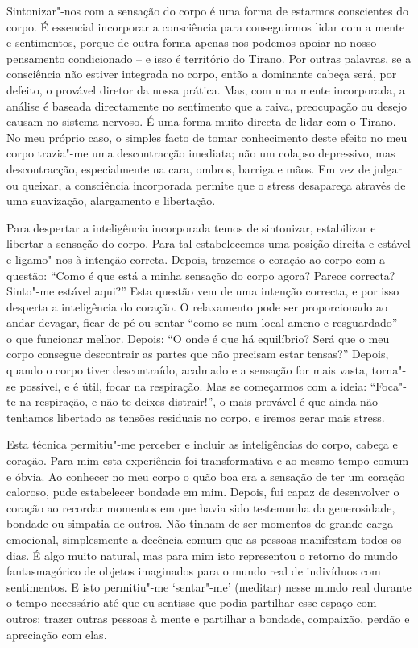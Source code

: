 Sintonizar"-nos com a sensação do corpo é uma forma de estarmos
conscientes do corpo. É essencial incorporar a consciência para
conseguirmos lidar com a mente e sentimentos, porque de outra forma
apenas nos podemos apoiar no nosso pensamento condicionado -- e isso é
território do Tirano. Por outras palavras, se a consciência não estiver
integrada no corpo, então a dominante cabeça será, por defeito, o
provável diretor da nossa prática. Mas, com uma mente incorporada, a
análise é baseada directamente no sentimento que a raiva, preocupação ou
desejo causam no sistema nervoso. É uma forma muito directa de lidar com
o Tirano. No meu próprio caso, o simples facto de tomar conhecimento
deste efeito no meu corpo trazia"-me uma descontracção imediata; não um
colapso depressivo, mas descontracção, especialmente na cara, ombros,
barriga e mãos. Em vez de julgar ou queixar, a consciência incorporada
permite que o stress desapareça através de uma suavização, alargamento e
libertação.

\sectionBreak

Para despertar a inteligência incorporada temos de sintonizar,
estabilizar e libertar a sensação do corpo. Para tal estabelecemos uma
posição direita e estável e ligamo"-nos à intenção correta. Depois,
trazemos o coração ao corpo com a questão: “Como é que está a minha
sensação do corpo agora? Parece correcta? Sinto"-me estável aqui?” Esta
questão vem de uma intenção correcta, e por isso desperta a inteligência
do coração. O relaxamento pode ser proporcionado ao andar devagar, ficar
de pé ou sentar “como se num local ameno e resguardado” -- o que
funcionar melhor. Depois: “O onde é que há equilíbrio? Será que o meu
corpo consegue descontrair as partes que não precisam estar tensas?”
Depois, quando o corpo tiver descontraído, acalmado e a sensação for
mais vasta, torna"-se possível, e é útil, focar na respiração. Mas se
começarmos com a ideia: “Foca"-te na respiração, e não te deixes
distrair!”, o mais provável é que ainda não tenhamos libertado as
tensões residuais no corpo, e iremos gerar mais stress.

Esta técnica permitiu"-me perceber e incluir as inteligências do corpo,
cabeça e coração. Para mim esta experiência foi transformativa e ao
mesmo tempo comum e óbvia. Ao conhecer no meu corpo o quão boa era a
sensação de ter um coração caloroso, pude estabelecer bondade em mim.
Depois, fui capaz de desenvolver o coração ao recordar momentos em que
havia sido testemunha da generosidade, bondade ou simpatia de outros.
Não tinham de ser momentos de grande carga emocional, simplesmente a
decência comum que as pessoas manifestam todos os dias. É algo muito
natural, mas para mim isto representou o retorno do mundo fantasmagórico
de objetos imaginados para o mundo real de indivíduos com sentimentos. E
isto permitiu"-me `sentar"-me' (meditar) nesse mundo real durante o tempo
necessário até que eu sentisse que podia partilhar esse espaço com
outros: trazer outras pessoas à mente e partilhar a bondade, compaixão,
perdão e apreciação com elas.

